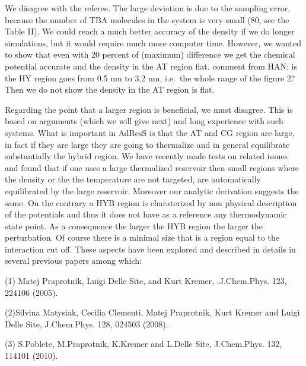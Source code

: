 \documentclass[12pt]{article}
\newcommand{\recheck}[1]{{\color{red} #1}}
\begin{document}
We disagree with the referee.
\recheck{The large deviation is due to the sampling error, because the
  number of TBA molecules in the system is very small (80, see the Table II).
  We could reach a much better accuracy of the density if we do longer simulations,
  but it would require much more computer time.}
However, we wanted to show that even with 20 percent of (maximum)
difference we get the chemical potential accurate and the density in
the AT region flat.
\recheck{comment from HAN: is the HY region goes
  from 0.5 nm to 3.2 nm, i.e.~the whole range of the figure 2? Then we
  do not show the density in the AT region is flat.}

Regarding the point
that a larger region is beneficial, we must disagree. This is based on
arguments (which we will give next) and long experience with such
systems. What is important in AdResS is that the AT and CG region are
large, in fact if they are large they are going to thermalize and in
general equilibrate substantially the hybrid region.  We have recently
made tests on related issues and found that if one uses a large
thermalized reservoir then small regions where the density or the the
temperature are not targeted, are automatically equilibrated by the
large reservoir. Moreover our analytic derivation suggests the same.
On the contrary a HYB region is charaterized by non physical
description of the potentials and thus it does not have as a reference
any thermodynamic state point. As a consequence the larger the HYB
region the larger the perturbation. Of course there is a minimal size
that is a region equal to the interaction cut off.  These aspects have
been explored and described in details in several previous papers
among which:

(1) Matej Praprotnik, Luigi Delle Site, and Kurt Kremer, .J.Chem.Phys. 123, 224106 (2005).

(2)Silvina Matysiak, Cecilia Clementi, Matej Praprotnik, Kurt Kremer and Luigi Delle Site, J.Chem.Phys. 128, 024503 (2008).

(3) S.Poblete, M.Praprotnik, K.Kremer and L.Delle Site,  J.Chem.Phys. 132, 114101 (2010).
\end{document}
